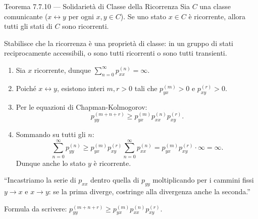 \documentclass[11pt,a4paper]{report}
\begin{document}
\begin{teoremabox}{Teorema 7.7.10 --- Solidarietà di Classe della Ricorrenza}
Sia $C$ una classe comunicante ($x \leftrightarrow y$ per ogni $x,y \in C$). Se uno stato $x \in C$ è ricorrente, allora tutti gli stati di $C$ sono ricorrenti.

\begin{cosafa}
Stabilisce che la ricorrenza è una proprietà di classe: in un gruppo di stati reciprocamente accessibili, o sono tutti ricorrenti o sono tutti transienti.
\end{cosafa}

\begin{dimostrazione}
\begin{enumerate}
    \item Sia $x$ ricorrente, dunque $\sum_{n=0}^\infty p_{xx}^{(n)} = \infty$.
    \item Poiché $x \leftrightarrow y$, esistono interi $m, r > 0$ tali che $p_{yx}^{(m)} > 0$ e $p_{xy}^{(r)} > 0$.
    \item Per le equazioni di Chapman-Kolmogorov:
    \[
    p_{yy}^{(m+n+r)} \ge p_{yx}^{(m)} p_{xx}^{(n)} p_{xy}^{(r)}.
    \]
    \item Sommando su tutti gli $n$:
    \[
    \sum_{n=0}^\infty p_{yy}^{(n)} \ge p_{yx}^{(m)} p_{xy}^{(r)} \sum_{n=0}^\infty p_{xx}^{(n)} = p_{yx}^{(m)} p_{xy}^{(r)} \cdot \infty = \infty.
    \]
    Dunque anche lo stato $y$ è ricorrente.
\end{enumerate}
\end{dimostrazione}

\begin{oralbox}
``Incastriamo la serie di $p_{xx}$ dentro quella di $p_{yy}$ moltiplicando per i cammini fissi $y \to x$ e $x \to y$: se la prima diverge, costringe alla divergenza anche la seconda.''
\end{oralbox}

\begin{tipbox}
Formula da scrivere: \textbf{$p_{yy}^{(m+n+r)} \ge p_{yx}^{(m)} p_{xx}^{(n)} p_{xy}^{(r)}$}.
\end{tipbox}
\end{teoremabox}

\vspace{0.3cm}
\end{document}
